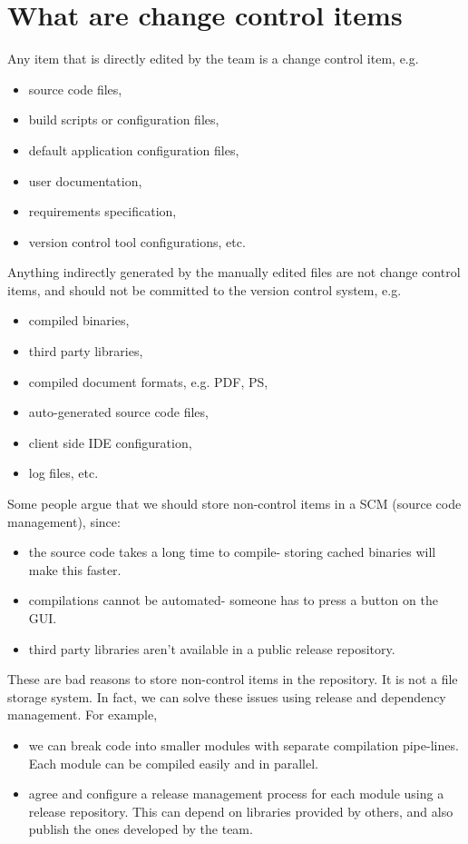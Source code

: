 \documentclass[a4paper, openany]{memoir}
\begin{document}
\section{What are change control items}
Any item that is directly edited by the team is a change control item, e.g.
\begin{itemize}
    \item source code files,
    \item build scripts or configuration files,
    \item default application configuration files,
    \item user documentation,
    \item requirements specification,
    \item version control tool configurations, etc.
\end{itemize}
Anything indirectly generated by the manually edited files are not change control items, and should not be committed to the version control system, e.g.
\begin{itemize}
    \item compiled binaries,
    \item third party libraries,
    \item compiled document formats, e.g. PDF, PS,
    \item auto-generated source code files,
    \item client side IDE configuration,
    \item log files, etc.
\end{itemize}

Some people argue that we should store non-control items in a SCM (source code management), since:
\begin{itemize}
    \item the source code takes a long time to compile- storing cached binaries will make this faster.
    \item compilations cannot be automated- someone has to press a button on the GUI.
    \item third party libraries aren't available in a public release repository.
\end{itemize}
These are bad reasons to store non-control items in the repository. It is not a file storage system. In fact, we can solve these issues using release and dependency management. For example,
\begin{itemize}
    \item we can break code into smaller modules with separate compilation pipe-lines. Each module can be compiled easily and in parallel.
    \item agree and configure a release management process for each module using a release repository. This can depend on libraries provided by others, and also publish the ones developed by the team.
\end{itemize}
\end{document}
